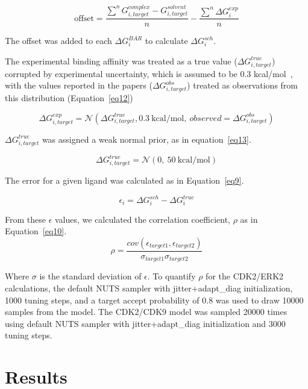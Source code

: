 \documentclass[phd,tocprelim]{cornell}
\begin{document}
\begin{equation}\label{eq8}
\text{offset} =  \frac{\sum^n G^{complex}_{i,target} - G^{solvent}_{i,target}}{n} - \frac{\sum^n \Delta G^{exp}_{i}}{n}
\end{equation}

The offset was added to each $\Delta G^{BAR}_{i}$ to calculate $\Delta G^{sch}_{i}$. 

The experimental binding affinity was treated as a true value ($\Delta G^{true}_{i,target}$) corrupted by experimental uncertainty, which is assumed to be 0.3 kcal/mol~\citep{BROWN2009420}, with the values reported in the papers ($\Delta G^{obs}_{i,target}$) treated as observations from this distribution (Equation~\ref{eq12}) 

\begin{equation}\label{eq12}
\Delta G^{exp}_{i,target} = \mathcal{N}(\Delta G^{true}_{i,target}, 0.3 ~\text{kcal/mol},~observed = \Delta G^{obs}_{i,target})
\end{equation}

$\Delta G^{true}_{i,target}$ was assigned a weak normal prior, as in equation~\ref{eq13}. 

\begin{equation}\label{eq13}
\Delta G^{true}_{i,target} = \mathcal{N}(0, ~50~\text{kcal/mol})
\end{equation}

The error for a given ligand was calculated as in Equation~\ref{eq9}. 

\begin{equation}\label{eq9}
\epsilon_i = \Delta G^{sch}_i - \Delta G^{true}_i
\end{equation}

From these $\epsilon$ values, we calculated the correlation coefficient, $\rho$ as in Equation~\ref{eq10}. 
\begin{equation}\label{eq10}
\rho = \frac{cov(\epsilon_{target1}, \epsilon_{target2})}{\sigma_{target 1}\sigma_{target 2}}
\end{equation}
 
 Where $\sigma$ is the standard deviation of $\epsilon$. To quantify $\rho$ for the CDK2/ERK2 calculations, the default NUTS sampler with jitter+adapt\_diag initialization, 1000 tuning steps, and a target accept probability of 0.8 was used to draw 10000 samples from the model. The CDK2/CDK9 model was sampled 20000 times using default NUTS sampler with jitter+adapt\_diag initialization and 3000 tuning steps. 

\section{Results}
\end{document}
